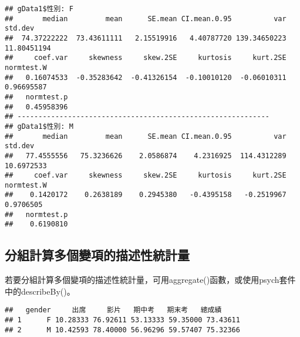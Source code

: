 \documentclass[
]{book}
\newenvironment{Shaded}{\begin{snugshade}}{\end{snugshade}}
\newcommand{\AttributeTok}[1]{\textcolor[rgb]{0.77,0.63,0.00}{#1}}
\newcommand{\CommentTok}[1]{\textcolor[rgb]{0.56,0.35,0.01}{\textit{#1}}}
\newcommand{\DecValTok}[1]{\textcolor[rgb]{0.00,0.00,0.81}{#1}}
\newcommand{\FunctionTok}[1]{\textcolor[rgb]{0.00,0.00,0.00}{#1}}
\newcommand{\NormalTok}[1]{#1}
\newcommand{\SpecialCharTok}[1]{\textcolor[rgb]{0.00,0.00,0.00}{#1}}
\begin{document}
\begin{verbatim}
## gData1$性別: F
##       median         mean      SE.mean CI.mean.0.95          var      std.dev 
##  74.37222222  73.43611111   2.15519916   4.40787720 139.34650223  11.80451194 
##     coef.var     skewness     skew.2SE     kurtosis     kurt.2SE   normtest.W 
##   0.16074533  -0.35283642  -0.41326154  -0.10010120  -0.06010311   0.96695587 
##   normtest.p 
##   0.45958396 
## ------------------------------------------------------------ 
## gData1$性別: M
##       median         mean      SE.mean CI.mean.0.95          var      std.dev 
##   77.4555556   75.3236626    2.0586874    4.2316925  114.4312289   10.6972533 
##     coef.var     skewness     skew.2SE     kurtosis     kurt.2SE   normtest.W 
##    0.1420172    0.2638189    0.2945380   -0.4395158   -0.2519967    0.9706505 
##   normtest.p 
##    0.6190810
\end{verbatim}

\hypertarget{ux5206ux7d44ux8a08ux7b97ux591aux500bux8b8aux9805ux7684ux63cfux8ff0ux6027ux7d71ux8a08ux91cf}{%
\subsection{分組計算多個變項的描述性統計量}\label{ux5206ux7d44ux8a08ux7b97ux591aux500bux8b8aux9805ux7684ux63cfux8ff0ux6027ux7d71ux8a08ux91cf}}

若要分組計算多個變項的描述性統計量，可用aggregate()函數，或使用psych套件中的describeBy()。

\begin{Shaded}
\end{Shaded}

\begin{verbatim}
##   gender     出席     影片   期中考   期末考   總成績
## 1      F 10.28333 76.92611 53.13333 59.35000 73.43611
## 2      M 10.42593 78.40000 56.96296 59.57407 75.32366
\end{verbatim}

\begin{Shaded}
\end{Shaded}
\end{document}
